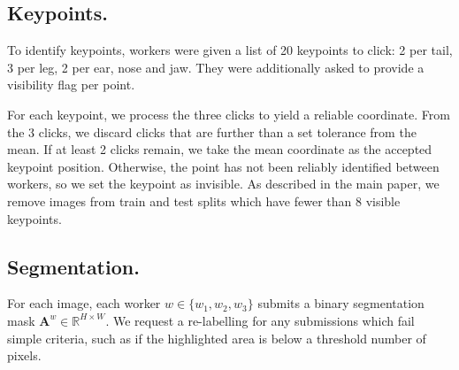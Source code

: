 \subsection{Keypoints.} 
To identify keypoints, workers were given a list of 20 keypoints to click: 2 per tail, 3 per leg, 2 per ear, nose and jaw. They were additionally asked to provide a visibility flag per point. 

For each keypoint, we process the three clicks to yield a reliable coordinate. From the 3 clicks, we discard clicks that are further than a set tolerance from the mean. If at least 2 clicks remain, we take the mean coordinate as the accepted keypoint position. Otherwise, the point has not been reliably identified between workers, so we set the keypoint as invisible. As described in the main paper, we remove images from train and test splits which have fewer than 8 visible keypoints.








\subsection{Segmentation.}

For each image, each worker $w \in \{w_{1}, w_{2}, w_{3}\}$ submits a binary segmentation mask $\mathbf{A}^{w} \in \mathbb{R}^{H \times W}$. We request a re-labelling for any submissions which fail simple criteria, such as if the highlighted area is below a threshold number of pixels.

